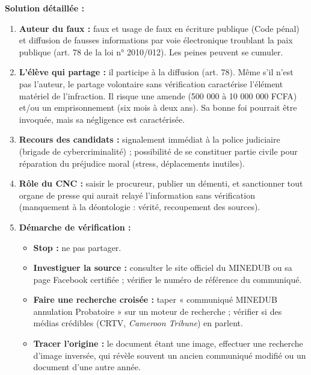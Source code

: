 \documentclass[11pt]{article}
\begin{document}
\begin{exoresolu}
\tcblower
\textbf{Solution détaillée :}
\begin{enumerate}
    \item \textbf{Auteur du faux :} faux et usage de faux en écriture publique (Code pénal) et diffusion de fausses informations par voie électronique troublant la paix publique (art. 78 de la loi n° 2010/012). Les peines peuvent se cumuler.
    \item \textbf{L'élève qui partage :} il participe à la diffusion (art. 78). Même s'il n'est pas l'auteur, le partage volontaire sans vérification caractérise l'élément matériel de l'infraction. Il risque une amende (500 000 à 10 000 000 FCFA) et/ou un emprisonnement (six mois à deux ans). Sa bonne foi pourrait être invoquée, mais sa négligence est caractérisée.
    \item \textbf{Recours des candidats :} signalement immédiat à la police judiciaire (brigade de cybercriminalité) ; possibilité de se constituer partie civile pour réparation du préjudice moral (stress, déplacements inutiles).
    \item \textbf{Rôle du CNC :} saisir le procureur, publier un démenti, et sanctionner tout organe de presse qui aurait relayé l'information sans vérification (manquement à la déontologie : vérité, recoupement des sources).
    \item \textbf{Démarche de vérification :}
    \begin{itemize}
        \item \textbf{Stop :} ne pas partager.
        \item \textbf{Investiguer la source :} consulter le site officiel du MINEDUB ou sa page Facebook certifiée ; vérifier le numéro de référence du communiqué.
        \item \textbf{Faire une recherche croisée :} taper « communiqué MINEDUB annulation Probatoire » sur un moteur de recherche ; vérifier si des médias crédibles (CRTV, \emph{Cameroon Tribune}) en parlent.
        \item \textbf{Tracer l'origine :} le document étant une image, effectuer une recherche d'image inversée, qui révèle souvent un ancien communiqué modifié ou un document d'une autre année.
    \end{itemize}
\end{enumerate}
\end{exoresolu}
\end{document}

